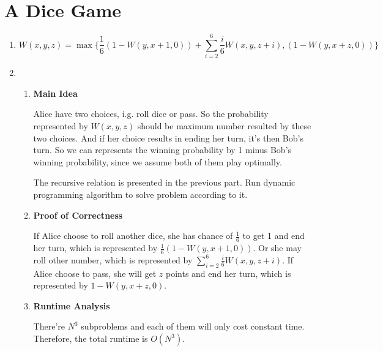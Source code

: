 \documentclass[11pt]{article}
\newenvironment{qparts}{\begin{enumerate}[{(}a{)}]}{\end{enumerate}}
\begin{document}
\section{A Dice Game}
\begin{qparts}
	
	\item 
	
	\[
		W(x, y, z) = \max \{\frac{1}{6} (1 - W(y, x+1, 0)) + \sum_{i=2}^6 \frac{i}{6} W(x, y, z + i), (1 - W(y, x+ z, 0)) \}		
	\]
	
	\item 
	
	\renewcommand{\theenumii}{\roman{enumii}}
	\begin{enumerate}
		\item \textbf{Main Idea}
		
		Alice have two choices, i.g. roll dice or pass. So the probability represented by $W(x, y, z)$ should be maximum number resulted by these two choices. And if her choice results in ending her turn, it's then Bob's turn. So we can represents the winning probability by 1 minus Bob's winning probability, since we assume both of them play optimally.
		
		The recursive relation is presented in the previous part. Run dynamic programming algorithm to solve problem according to it.
		
		\item \textbf{Proof of Correctness}
		
		If Alice choose to roll another dice, she has chance of $\frac{1}{6}$ to get 1 and end her turn, which is represented by $\frac{1}{6} (1 - W(y, x+1, 0))$. Or she may roll other number, which is represented by $\sum_{i=2}^6 \frac{i}{6} W(x, y, z + i)$. If Alice choose to pass, she will get $z$ points and end her turn, which is represented by $1 - W(y, x+ z, 0)$.
		
		\item \textbf{Runtime Analysis}
		
		There're $N^3$ subproblems and each of them will only cost constant time. Therefore, the total runtime is $O(N^3)$.
	
	\end{enumerate}
		
\end{qparts}



\newpage
\end{document}

